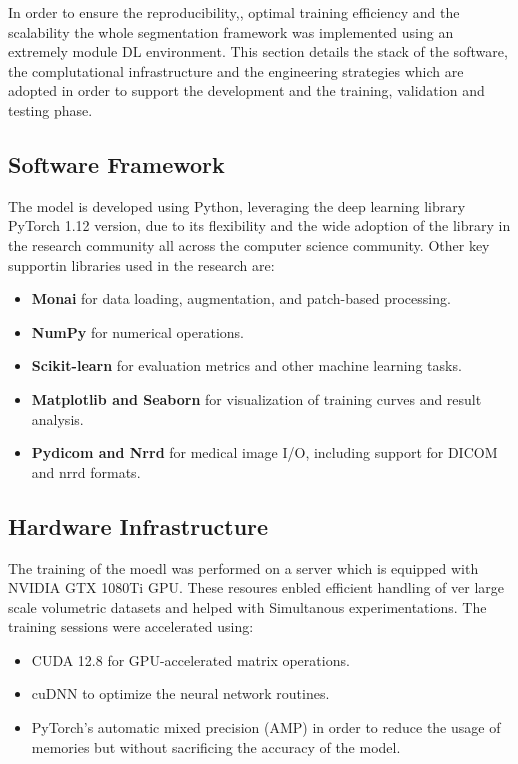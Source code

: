 In order to ensure the reproducibility,, optimal training efficiency and the scalability the whole segmentation framework was implemented using an extremely module DL environment. This section details the stack of the software, the complutational infrastructure and the engineering strategies which are adopted in order to support the development and the training, validation and testing phase.

\subsection{Software Framework}
The model is developed using Python, leveraging the deep learning library PyTorch 1.12 version, due to its flexibility and the wide adoption of the library in the research community all across the computer science community. Other key supportin libraries used in the research are:

\begin{itemize} \item \textbf{Monai} for data loading, augmentation, and patch-based processing. \item \textbf{NumPy} for numerical operations. \item \textbf{Scikit-learn} for evaluation metrics and other machine learning tasks. \item \textbf{Matplotlib and Seaborn} for visualization of training curves and result analysis. \item \textbf{Pydicom and Nrrd} for medical image I/O, including support for DICOM and nrrd formats. \end{itemize}

\subsection{Hardware Infrastructure}
The training of the moedl was performed on a server which is equipped with NVIDIA GTX 1080Ti GPU. These resoures enbled efficient handling of ver large scale volumetric datasets and helped with Simultanous experimentations. The training sessions were accelerated using:

\begin{itemize} \item CUDA 12.8 for GPU-accelerated matrix operations. \item cuDNN to optimize the neural network routines. \item PyTorch's automatic mixed precision (AMP) in order to reduce the usage of memories but without sacrificing the accuracy of the model. \end{itemize}

